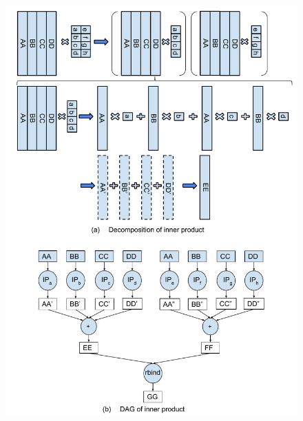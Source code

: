 \begin{figure}
\centering
\includegraphics[scale=0.4]{./inner_prod_tall.pdf}
\vspace{-5pt}
\caption{}
\vspace{-5pt}
\label{fig:inner_prod}
\end{figure}
